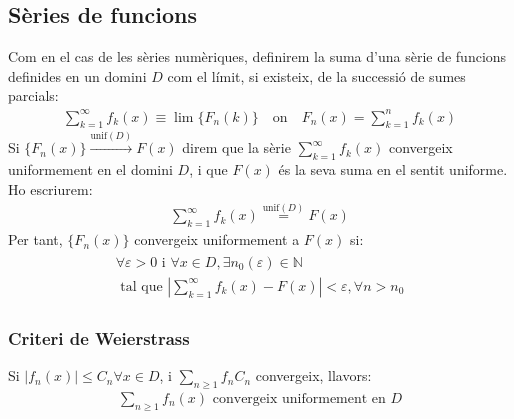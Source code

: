 \subsection{Sèries de funcions}
Com en el cas de les sèries numèriques, definirem la suma d'una sèrie de funcions definides en un domini $D$ com el límit, si existeix, de la successió de sumes parcials:
\begin{align}
    \sum\limits_{k=1}^{\infty} f_{k} (x) \equiv \lim \{ F_{n} (k) \} \quad \text{on} \quad F_{n} (x) = \sum\limits_{k=1}^{n} f_{k} (x)
\end{align}
Si $\{ F_{n} (x) \} \overset{\text{unif}(D)}{\longrightarrow} F(x)$ direm que la sèrie $\sum_{k=1}^{\infty} f_{k} (x)$ convergeix uniformement en el domini $D$, i que $F(x)$ és la seva suma en el sentit uniforme. Ho escriurem:
\begin{align}
    \sum\limits_{k=1}^{\infty} f_{k} (x) \overset{\text{unif}(D)}{=} F(x)
\end{align}
Per tant, $\{F_{n}(x)\}$ convergeix uniformement a $F(x)$ si:
\begin{align}
    \begin{gathered}
        \forall \varepsilon > 0 \text{ i } \forall x \in D, \exists n_{0}(\varepsilon) \in \mathbb{N} \\
        \text{ tal que } | \sum\limits_{k=1}^{\infty} f_{k} (x) - F(x) | < \varepsilon, \forall n > n_{0}
    \end{gathered}
\end{align}

\subsubsection*{Criteri de Weierstrass}
Si $|f_{n} (x)| \leq C_{n} \forall x \in D$, i $\sum_{n \geq 1} f_{n} C_{n}$ convergeix, llavors:
\begin{align}
    \sum\limits_{n \geq 1} f_{n} (x) \text{ convergeix uniformement en } D
\end{align}

